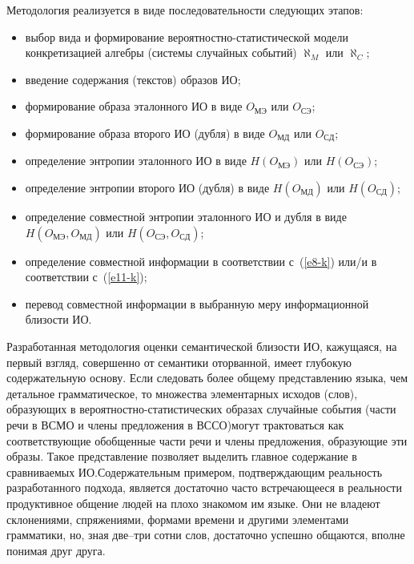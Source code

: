 \begin{multicols}{2}
   Методология реализуется в виде последовательности следующих этапов: 
   \begin{itemize}
\item выбор вида и формирование вероятностно-ста\-ти\-сти\-че\-ской модели 
конкретизацией ал\-геб\-ры (системы случайных событий) $\aleph_M$ или 
$\aleph_C$;
\item введение содержания (текстов) образов ИО;
\item формирование образа эталонного ИО в виде $O_{\mathrm{МЭ}}$ или 
$O_{\mathrm{СЭ}}$;
\item формирование образа второго ИО (дубля) в виде $O_{\mathrm{МД}}$ или 
$O_{\mathrm{СД}}$; 
\item определение энтропии эталонного ИО в виде $H(O_{\mathrm{МЭ}})$ или 
$H(O_{\mathrm{СЭ}})$;
\item определение энтропии второго ИО (дубля) в виде $H(O_{\mathrm{МД}})$ 
или $H(O_{\mathrm{СД}})$;
\item определение совместной энтропии эталонного ИО и дубля в виде 
$H(O_{\mathrm{МЭ}}, O_{\mathrm{МД}})$ или $H(O_{\mathrm{СЭ}}, 
O_{\mathrm{СД}})$; 
\item определение совместной информации в соответствии с~(\ref{e8-k}) 
или/и в соответствии с~(\ref{e11-k});
\item перевод совместной информации в выбранную меру информационной 
близости ИО.
\end{itemize}

   Разработанная методология оценки семантической близости ИО, 
кажущаяся, на первый взгляд, совершенно от семантики оторванной, имеет 
глубокую содержательную основу. Если следовать более общему 
представлению языка, чем детальное грамматическое, то множества 
элементарных исходов (слов), образующих в вероятностно-ста\-ти\-сти\-че\-ских 
образах случайные события (час\-ти речи в ВСМО и члены предложения в 
ВССО)\linebreak могут трактоваться как соответствующие обобщенные час\-ти речи и 
члены предложения, образующие эти образы. Такое представление позволяет 
выделить главное содержание в сравниваемых ИО.\linebreak Содержательным 
примером, подтверждающим реальность разработанного подхода, является 
достаточно час\-то встречающееся в реальности продуктивное общение людей 
на плохо знакомом им \mbox{языке}. Они не владеют склонениями, спряжениями, 
формами времени и другими элементами грамматики, но, зная две--три сотни 
слов, достаточно успешно общаются, вполне понимая друг друга. 
   

\end{multicols}
